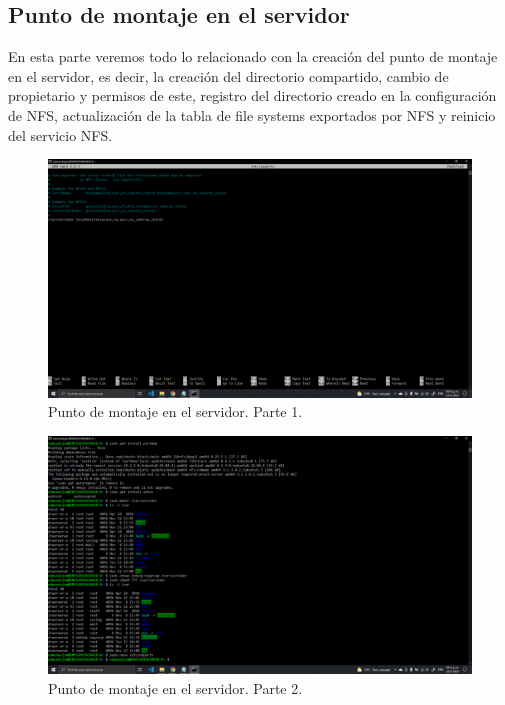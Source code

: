 \documentclass[11pt]{article}
\begin{document}
		\subsection{Punto de montaje en el servidor}
		En esta parte veremos todo lo relacionado con la creación del punto de montaje en el servidor, es decir, la creación del directorio compartido, cambio  de propietario y permisos de este,  registro del directorio creado en la configuración de NFS, actualización de la tabla de file systems exportados por NFS y reinicio del servicio NFS.
		\begin{figure}[H]
			\centering
			\includegraphics[scale=0.34]{resources/servidor1.png}
			\caption{Punto de montaje en el servidor. Parte 1.}\label{fig:picture}
		\end{figure}
		\begin{figure}[H]
			\centering
			\includegraphics[scale=0.34]{resources/servidor2.png}
			\caption{Punto de montaje en el servidor. Parte 2.}\label{fig:picture}
		\end{figure}
\end{document}
